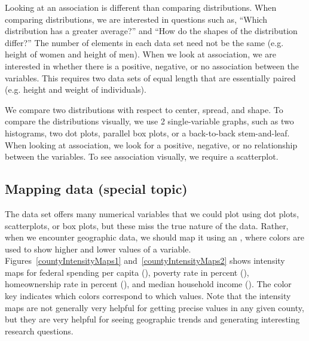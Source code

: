 Looking at an association is different than comparing distributions. When comparing distributions, we are interested in questions such as, ``Which distribution has a greater average?'' and ``How do the shapes of the distribution differ?'' The number of elements in each data set need not be the same (e.g. height of women and height of men). When we look at association, we are interested in whether there is a positive, negative, or no association between the variables. This requires two data sets of equal length that are essentially paired (e.g. height and weight of individuals).

\begin{tipBox}{
We compare two distributions with respect to center, spread, and shape.  To compare the distributions visually, we use 2 single-variable graphs, such as two histograms, two dot plots, parallel box plots, or a back-to-back stem-and-leaf. When looking at association, we look for a positive, negative, or no relationship between the variables. To see association visually, we require a scatterplot.}
\end{tipBox}




\subsection{Mapping data (special topic)}


The  data set offers many numerical variables that we could plot using dot plots, scatterplots, or box plots, but these miss the true nature of the data. Rather, when we encounter geographic data, we should map it using an , where colors are used to show higher and lower values of a variable. Figures~\ref{countyIntensityMaps1} and~\ref{countyIntensityMaps2} shows intensity maps for federal spending per capita (), poverty rate in percent (), homeownership rate in percent (), and median household income (). The color key indicates which colors correspond to which values. Note that the intensity maps are not generally very helpful for getting precise values in any given county, but they are very helpful for seeing geographic trends and generating interesting research questions.

